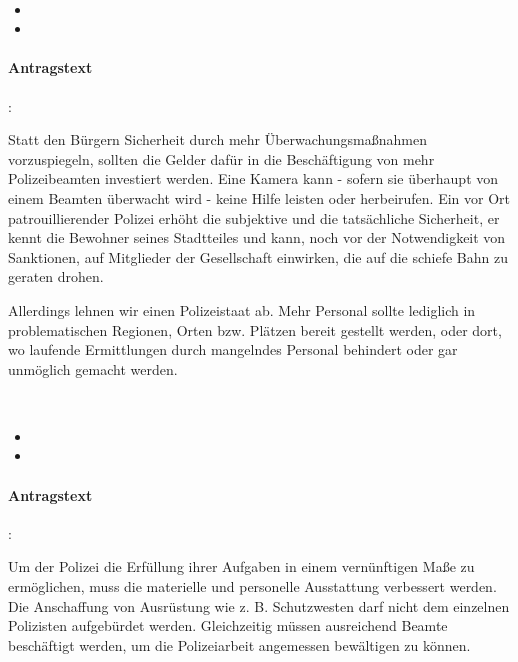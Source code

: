 

\label{wpa:polizei1}
\\
\begin{itemize}
\item {}
\item {}
\end{itemize}

\paragraph{Antragstext}:

Statt den Bürgern Sicherheit durch mehr Überwachungsmaßnahmen vorzuspiegeln, sollten die Gelder dafür in die Beschäftigung von mehr Polizeibeamten investiert werden. Eine Kamera kann - sofern sie überhaupt von einem Beamten überwacht wird - keine Hilfe leisten oder herbeirufen. Ein vor Ort patrouillierender Polizei erhöht die subjektive und die tatsächliche Sicherheit, er kennt die Bewohner {\Gu}seines{\Go} Stadtteiles und kann, noch vor der Notwendigkeit von Sanktionen, auf Mitglieder der Gesellschaft einwirken, die auf die schiefe Bahn zu geraten drohen.

Allerdings lehnen wir einen Polizeistaat ab. Mehr Personal sollte lediglich in problematischen Regionen, Orten bzw. Plätzen bereit gestellt werden, oder dort, wo laufende Ermittlungen durch mangelndes Personal behindert oder gar unmöglich gemacht werden.


\label{wpa:polizei2}
\\
\begin{itemize}
\item {}
\item {}
\end{itemize}

\paragraph{Antragstext}:

Um der Polizei die Erfüllung ihrer Aufgaben in einem vernünftigen Maße zu ermöglichen, muss die materielle und personelle Ausstattung verbessert werden. Die Anschaffung von Ausrüstung wie z. B. Schutzwesten darf nicht dem einzelnen Polizisten aufgebürdet werden. Gleichzeitig müssen ausreichend Beamte beschäftigt werden, um die Polizeiarbeit angemessen bewältigen zu können. 

